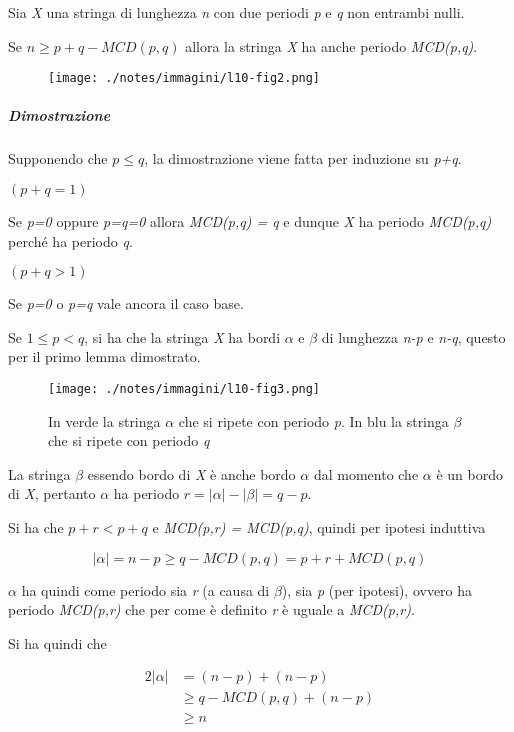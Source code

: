 Sia \emph{X} una stringa di lunghezza \emph{n} con due periodi \emph{p}
e \emph{q} non entrambi nulli.

Se $n \geq p + q - MCD(p,q)$ allora la stringa \emph{X} ha anche periodo \emph{MCD(p,q)}.

\begin{figure}[htbp]
\centering
\texttt{[image: ./notes/immagini/l10-fig2.png]}
\caption{}
\end{figure}

\subparagraph{Dimostrazione}\label{dimostrazione-2}

Supponendo che $p \leq q$, la dimostrazione viene fatta per induzione su \emph{p+q}.

$(p+q = 1)$ 

Se \emph{p=0} oppure \emph{p=q=0} allora \emph{MCD(p,q) = q} e dunque
\emph{X} ha periodo \emph{MCD(p,q)} perché ha periodo \emph{q}.

$(p+q > 1)$

Se \emph{p=0} o \emph{p=q} vale ancora il caso base.

Se $1 \leq p < q$, si ha che la stringa \emph{X} ha bordi $\alpha$ e $\beta$ di lunghezza \emph{n-p} e \emph{n-q}, questo per il primo lemma dimostrato.

\begin{figure}[htbp]
\centering
\texttt{[image: ./notes/immagini/l10-fig3.png]}
\caption{In verde la stringa $\alpha$ che si ripete con periodo
\emph{p}. In blu la stringa $\beta$ che si ripete con periodo
\emph{q}}
\end{figure}

La stringa $\beta$ essendo bordo di \emph{X} è anche bordo $\alpha$ dal momento che $\alpha$ è un bordo di \emph{X}, pertanto $\alpha$ ha periodo $r = |\alpha| - |\beta| = q -p$.

Si ha che $p+r < p + q$ e \emph{MCD(p,r) = MCD(p,q)}, quindi per ipotesi induttiva

$$
|\alpha| = n - p \geq q - MCD(p,q) = p+r+MCD(p,q)
$$

$ \alpha $ ha quindi come periodo sia \textit{r} (a causa di $ \beta $), sia \textit{p} (per ipotesi), ovvero ha periodo \textit{MCD(p,r)} che per come è definito \textit{r} è uguale a \textit{MCD(p,r)}.

Si ha quindi che

\begin{align*}
	2|\alpha| &= (n-p) + (n-p) \\
					 &\geq q - MCD(p,q) + (n-p) \\
					 &\geq n
\end{align*}

